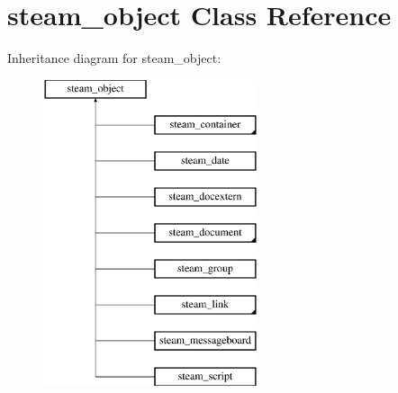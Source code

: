 \hypertarget{classsteam__object}{
\section{steam\_\-object Class Reference}
\label{classsteam__object}
}
Inheritance diagram for steam\_\-object:\begin{figure}[H]
\begin{center}
\leavevmode
\includegraphics[height=9.000000cm]{classsteam__object}
\end{center}
\end{figure}
